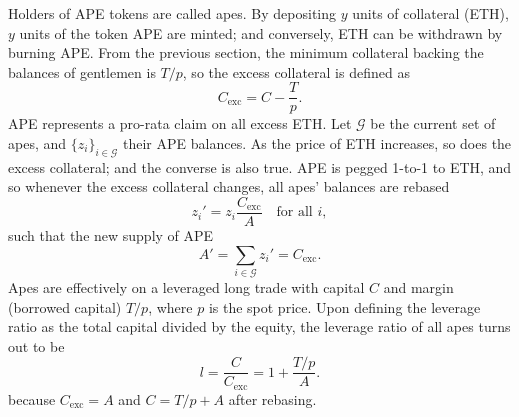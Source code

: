 \documentclass[journal,letterpaper,oneside,onecolumn,12pt]{IEEEtran}
\begin{document}
	
	Holders of APE tokens are called apes. By depositing $y$ units of collateral (ETH), $y$ units of the token APE are minted; and conversely, ETH can be withdrawn by burning APE.
	From the previous section, the minimum collateral backing the balances of gentlemen is $T/p$, so the excess collateral is defined as
	\begin{equation} \label{eq:exc2tot}
		C_\text{exc} = C-\frac{T}{p}.
	\end{equation}
	APE represents a pro-rata claim on all excess ETH.
	Let $\mathcal{G}$ be the current set of apes, and $\{z_i\}_{i\in \mathcal{G}}$ their APE balances. As the price of ETH increases, so does the excess collateral; and the converse is also true. APE is pegged 1-to-1 to ETH, and so whenever the excess collateral changes, all apes' balances are rebased
	\begin{equation} \label{eq:rebase}
		z_i' = z_i\frac{C_\text{exc}}{A} \quad\text{for all }i,
	\end{equation}
	such that the new supply of APE
	\begin{equation} \label{eq:TEA_supply}
		A' = \sum_{i\in \mathcal{G}} z_i' = C_\text{exc}.
	\end{equation}
	Apes are effectively on a leveraged long trade with capital $C$ and margin (borrowed capital) $T/p$, where $p$ is the spot price. Upon defining the leverage ratio as the total capital divided by the equity, the leverage ratio of all apes turns out to be
	\begin{equation} \label{eq:leverage:formula}
		l = \frac{C}{C_\text{exc}} = 1+\frac{T/p}{A}.
	\end{equation}
	because $C_\text{exc}=A$ and $C = T/p +A$ after rebasing.
\end{document}
